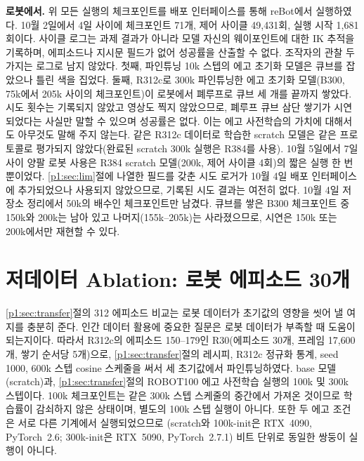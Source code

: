 \documentclass[conference,10pt]{IEEEtran}
\begin{document}
\textbf{로봇에서.} 위 모든 실행의 체크포인트를 배포 인터페이스를 통해 reBot에서 실행하였다. 10월 2일에서 4일 사이에 체크포인트 71개,
제어 사이클 49{,}431회, 실행 시작 1{,}681회이다. 사이클 로그는 과제 결과가 아니라 모델 자신의 웨이포인트에 대한 IK 추적을 기록하며,
에피소드나 지시문 필드가 없어 성공률을 산출할 수 없다. 조작자의 관찰 두 가지는 로그로 남지 않았다. 첫째, 파인튜닝 10k 스텝의 에고 초기화
모델은 큐브를 잡았으나 틀린 색을 집었다. 둘째, R312c로 300k 파인튜닝한 에고 초기화 모델(B300, 75k에서 205k 사이의 체크포인트)이
로봇에서 폐루프로 큐브 세 개를 끝까지 쌓았다. 시도 횟수는 기록되지 않았고 영상도 찍지 않았으므로, 폐루프 큐브 삼단 쌓기가 시연되었다는
사실만 말할 수 있으며 성공률은 없다. 이는 에고 사전학습의 가치에 대해서도 아무것도 말해 주지 않는다. 같은 R312c 데이터로 학습한
scratch 모델은 같은 프로토콜로 평가되지 않았다(완료된 scratch 300k 실행은 R384를 사용). 10월 5일에서 7일 사이 양팔 로봇 사용은 R384
scratch 모델(200k, 제어 사이클 4회)의 짧은 실행 한 번뿐이었다. \ref{p1:sec:lim}절에 나열한 필드를 갖춘 시도 로거가 10월 4일 배포
인터페이스에 추가되었으나 사용되지 않았으므로, 기록된 시도 결과는 여전히 없다. 10월 4일 저장소 정리에서 50k의 배수인 체크포인트만
남겼다. 큐브를 쌓은 B300 체크포인트 중 150k와 200k는 남아 있고 나머지(155k--205k)는 사라졌으므로, 시연은 150k 또는 200k에서만 재현할
수 있다.

\section{저데이터 Ablation: 로봇 에피소드 30개}\label{p1:sec:r30}
\ref{p1:sec:transfer}절의 312 에피소드 비교는 로봇 데이터가 초기값의 영향을 씻어 낼 여지를 충분히 준다. 인간 데이터 활용에 중요한 질문은
로봇 데이터가 부족할 때 도움이 되는지이다. 따라서 R312c의 에피소드 150--179인 R30(에피소드 30개, 프레임 17{,}600개, 쌓기 순서당 5개)으로,
\ref{p1:sec:transfer}절의 레시피, R312c 정규화 통계, seed 1000, 600k 스텝 cosine 스케줄을 써서 세 초기값에서 파인튜닝하였다. base 모델
(scratch)과, \ref{p1:sec:transfer}절의 ROBOT100 에고 사전학습 실행의 100k 및 300k 스텝이다. 100k 체크포인트는 같은 300k 스텝 스케줄의 중간에서
가져온 것이므로 학습률이 감쇠하지 않은 상태이며, 별도의 100k 스텝 실행이 아니다. 또한 두 에고 조건은 서로 다른 기계에서 실행되었으므로
(scratch와 100k-init은 RTX~4090, PyTorch~2.6; 300k-init은 RTX~5090, PyTorch~2.7.1) 비트 단위로 동일한 쌍둥이 실행이 아니다.
\end{document}
